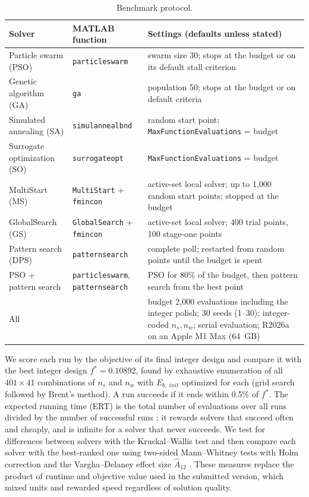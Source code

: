 \documentclass[final,3p,times]{elsarticle}
\begin{document}
\begin{table}[htbp]
\centering
\scriptsize
\begin{tabular}{p{2.6cm} p{2.3cm} p{7.4cm}}
\toprule
\textbf{Solver} & \textbf{MATLAB function} & \textbf{Settings (defaults unless stated)} \\
\midrule
Particle swarm (PSO) & \texttt{particleswarm} & swarm size 30; stops at the budget or on its default stall criterion \\
Genetic algorithm (GA) & \texttt{ga} & population 50; stops at the budget or on default criteria \\
Simulated annealing (SA) & \texttt{simulannealbnd} & random start point; \texttt{MaxFunctionEvaluations} = budget \\
Surrogate optimization (SO) & \texttt{surrogateopt} & \texttt{MaxFunctionEvaluations} = budget \\
MultiStart (MS) & \texttt{MultiStart} + \texttt{fmincon} & active-set local solver; up to 1,000 random start points; stopped at the budget \\
GlobalSearch (GS) & \texttt{GlobalSearch} + \texttt{fmincon} & active-set local solver; 400 trial points, 100 stage-one points \\
Pattern search (DPS) & \texttt{patternsearch} & complete poll; restarted from random points until the budget is spent \\
PSO + pattern search & \texttt{particleswarm}, \texttt{patternsearch} & PSO for 80\% of the budget, then pattern search from the best point \\
\midrule
All & & budget 2,000 evaluations including the integer polish; 30 seeds (1--30); integer-coded $n_s, n_w$; serial evaluation; R2026a on an Apple M1 Max (64~GB) \\
\bottomrule
\end{tabular}
\caption{\label{tab:protocol} Benchmark protocol.}
\end{table}

We score each run by the objective of its final integer design and compare it with the best integer design $f^* = 0.10892$, found by exhaustive enumeration of all $401 \times 41$ combinations of $n_s$ and $n_w$ with $E_{b,\;init}$ optimized for each (grid search followed by Brent's method). A run succeeds if it ends within 0.5\% of $f^*$. The expected running time (ERT) is the total number of evaluations over all runs divided by the number of successful runs \cite{hansen2021coco}; it rewards solvers that succeed often and cheaply, and is infinite for a solver that never succeeds. We test for differences between solvers with the Kruskal--Wallis test and then compare each solver with the best-ranked one using two-sided Mann--Whitney tests with Holm correction and the Vargha--Delaney effect size $\hat{A}_{12}$ \cite{derrac2011tutorial, vargha2000a12}. These measures replace the product of runtime and objective value used in the submitted version, which mixed units and rewarded speed regardless of solution quality.
\end{document}

